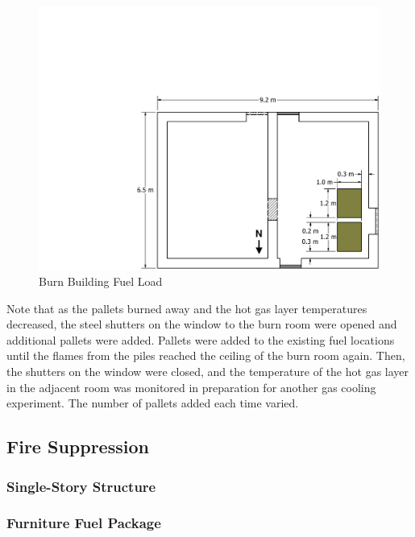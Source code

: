 \documentclass[12pt,oneside]{book}
\begin{document}
\begin{figure}[!ht]
	\includegraphics[width=\columnwidth]{../Figures/Floor_Plans/PDFs/West_Structure/DelCo_2012_West_Structure_Pallets}
	\caption{Burn Building Fuel Load}
	\label{fig:Burn_Building_Fuel_Load}
\end{figure}

Note that as the pallets burned away and the hot gas layer temperatures decreased, the steel shutters on the window to the burn room were opened and additional pallets were added. Pallets were added to the existing fuel locations until the flames from the piles reached the ceiling of the burn room again. Then, the shutters on the window were closed, and the temperature of the hot gas layer in the adjacent room was monitored in preparation for another gas cooling experiment.  The number of pallets added each time varied.

\clearpage

\subsection{Fire Suppression}
\label{sec:Fuel_Load_Fire_Suppression}

\subsubsection*{Single-Story Structure}
\label{sec:suppresion_single}

\subsubsection{Furniture Fuel Package}
\label{sec:fire_suppression_furniture_fuel}
\end{document}
